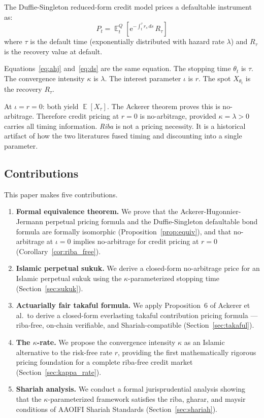 \documentclass[10pt,twocolumn]{article}
\theoremstyle{plain}
\theoremstyle{definition}
\DeclareMathOperator{\E}{\mathbb{E}}
\begin{document}
The Duffie-Singleton reduced-form credit model prices a defaultable
instrument as:
\begin{equation}
P_t = \E^Q_t\!\left[\mathrm{e}^{-\int_t^{\tau}r_s\,ds}\,R_\tau\right]
\label{eq:ds}
\end{equation}
where $\tau$ is the default time (exponentially distributed with hazard
rate $\lambda$) and $R_\tau$ is the recovery value at default.

Equations~\eqref{eq:ahj} and~\eqref{eq:ds} are the same equation.
The stopping time $\theta_t$ is $\tau$. The convergence intensity
$\kappa$ is $\lambda$. The interest parameter $\iota$ is $r$.
The spot $X_{\theta_t}$ is the recovery $R_\tau$.

At $\iota = r = 0$: both yield $\E[X_\tau]$. The Ackerer theorem
proves this is no-arbitrage. Therefore credit pricing at $r = 0$ is
no-arbitrage, provided $\kappa = \lambda > 0$ carries all timing
information. \textit{Riba} is not a pricing necessity. It is a
historical artifact of how the two literatures fused timing and
discounting into a single parameter.

\subsection*{Contributions}

This paper makes five contributions.

\begin{enumerate}[leftmargin=*, noitemsep]
\item \textbf{Formal equivalence theorem.} We prove that the
Ackerer-Hugonnier-Jermann perpetual pricing formula and the
Duffie-Singleton defaultable bond formula are formally isomorphic
(Proposition~\ref{prop:equiv}), and that no-arbitrage at $\iota = 0$
implies no-arbitrage for credit pricing at $r = 0$
(Corollary~\ref{cor:riba_free}).

\item \textbf{Islamic perpetual sukuk.} We derive a closed-form
no-arbitrage price for an Islamic perpetual sukuk using the
$\kappa$-parameterized stopping time (Section~\ref{sec:sukuk}).

\item \textbf{Actuarially fair takaful formula.} We apply Proposition~6
of Ackerer et al.\ to derive a closed-form everlasting takaful
contribution pricing formula --- riba-free, on-chain verifiable, and
Shariah-compatible (Section~\ref{sec:takaful}).

\item \textbf{The $\kappa$-rate.} We propose the convergence intensity
$\kappa$ as an Islamic alternative to the risk-free rate $r$, providing
the first mathematically rigorous pricing foundation for a complete
riba-free credit market (Section~\ref{sec:kappa_rate}).

\item \textbf{Shariah analysis.} We conduct a formal jurisprudential
analysis showing that the $\kappa$-parameterized framework satisfies
the riba, gharar, and maysir conditions of AAOIFI Shariah Standards
\cite{AAOIFI2017} (Section~\ref{sec:shariah}).
\end{enumerate}
\end{document}
